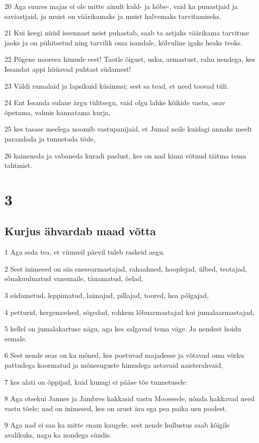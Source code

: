 \par 20 Aga suures majas ei ole mitte ainult kuld- ja hõbe-, vaid ka puuastjaid ja saviastjaid, ja muist on väärikamaks ja muist halvemaks tarvitamiseks.
\par 21 Kui keegi nüüd iseennast neist puhastab, saab ta astjaks väärikama tarvituse jaoks ja on pühitsetud ning tarvilik oma isandale, kõlvuline igaks heaks teoks.
\par 22 Põgene nooreea himude eest! Taotle õigust, usku, armastust, rahu nendega, kes Issandat appi hüüavad puhtast südamest!
\par 23 Väldi rumalaid ja lapsikuid küsimusi; sest sa tead, et need toovad tüli.
\par 24 Ent Issanda sulane ärgu tülitsegu, vaid olgu lahke kõikide vastu, osav õpetama, valmis kannatama kurja,
\par 25 kes tasase meelega noomib vastupanijaid, et Jumal neile kuidagi annaks meelt parandada ja tunnetada tõde,
\par 26 kaineneda ja vabaneda kuradi paelust, kes on nad kinni võtnud täitma tema tahtmist.


\chapter{3}

\section*{Kurjus ähvardab maad võtta}

\par 1 Aga seda tea, et viimseil päevil tuleb raskeid aegu.
\par 2 Sest inimesed on siis enesearmastajad, rahaahned, hooplejad, ülbed, teotajad, sõnakuulmatud vanemaile, tänamatud, õelad,
\par 3 südametud, leppimatud, laimajad, pillajad, toored, hea põlgajad,
\par 4 petturid, kergemeelsed, sõgedad, rohkem lõbuarmastajad kui jumalaarmastajad,
\par 5 kellel on jumalakartuse nägu, aga kes salgavad tema väge. Ja nendest hoidu eemale.
\par 6 Sest nende seas on ka mõned, kes poetuvad majadesse ja võtavad oma võrku pattudega koormatud ja mõnesuguste himudega aetavaid naisterahvaid,
\par 7 kes alati on õppijad, kuid kunagi ei pääse tõe tunnetusele:
\par 8 Aga otsekui Jannes ja Jambres hakkasid vastu Moosesele, nõnda hakkavad need vastu tõele; nad on inimesed, kes on arust ära ega pea paika usu poolest.
\par 9 Aga nad ei saa ka mitte enam kaugele, sest nende hullustus saab kõigile avalikuks, nagu ka nondega sündis.

